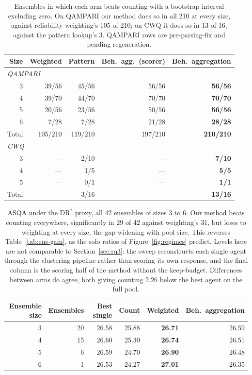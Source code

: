 \documentclass[11pt]{article}
\begin{document}
\begin{table}[t]
  \caption{Ensembles in which each arm beats counting with a bootstrap interval excluding zero. On QAMPARI our method does so in all 210 at every size, against reliability weighting's 105 of 210; on CWQ it does so in 13 of 16, against the pattern lookup's 3. QAMPARI rows are pre-parsing-fix and pending regeneration.}
  \label{tab:ens-sig}
  \centering
  \begin{tabular}{rrrrr}
    \toprule
    Size & Weighted & Pattern & Beh.\ agg.\ (scorer) & Beh.\ aggregation \\
    \midrule
    \multicolumn{5}{l}{\emph{QAMPARI}} \\
    3 & 39/56 & 45/56 & 56/56 & \textbf{56/56} \\
    4 & 39/70 & 44/70 & 70/70 & \textbf{70/70} \\
    5 & 20/56 & 23/56 & 50/56 & \textbf{56/56} \\
    6 &  7/28 &  7/28 & 21/28 & \textbf{28/28} \\
    \midrule
    Total & 105/210 & 119/210 & 197/210 & \textbf{210/210} \\
    \midrule
    \multicolumn{5}{l}{\emph{CWQ}} \\
    3 & --- & 2/10 & --- & \textbf{7/10} \\
    4 & --- & 1/5  & --- & \textbf{5/5}  \\
    5 & --- & 0/1  & --- & \textbf{1/1}  \\
    \midrule
    Total & --- & 3/16 & --- & \textbf{13/16} \\
    \bottomrule
  \end{tabular}
\end{table}

\begin{table}[t]
  \caption{ASQA under the $\mathrm{DR}^*$ proxy, all 42 ensembles of sizes 3 to 6. Our method beats counting everywhere, significantly in 29 of 42 against weighting's 31, but loses to weighting at every size, the gap widening with pool size. This reverses Table~\ref{tab:ens-gain}, as the solo ratios of Figure~\ref{fig:regimes} predict. Levels here are not comparable to Section~\ref{sec:rq3}: the sweep reconstructs each single agent through the clustering pipeline rather than scoring its own response, and the final column is the scoring half of the method without the keep-budget. Differences between arms do agree, both giving counting $2.26$ below the best agent on the full pool.}
  \label{tab:asqa}
  \centering
  \begin{tabular}{rrrrrr}
    \toprule
    Ensemble size & Ensembles & Best single & Count & Weighted & Beh.\ aggregation \\
    \midrule
    3 & 20 & 26.58 & 25.88 & \textbf{26.71} & 26.59 \\
    4 & 15 & 26.60 & 25.30 & \textbf{26.74} & 26.51 \\
    5 &  6 & 26.59 & 24.70 & \textbf{26.90} & 26.48 \\
    6 &  1 & 26.53 & 24.27 & \textbf{27.01} & 26.35 \\
    \bottomrule
  \end{tabular}
\end{table}
\end{document}

